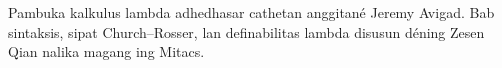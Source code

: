 \documentclass[../../include/open-logic-part]{subfiles}
\begin{document}

\begin{editorial}
Pambuka kalkulus lambda adhedhasar cathetan anggitané Jeremy Avigad. Bab sintaksis, sipat Church--Rosser, lan definabilitas lambda disusun déning Zesen Qian nalika magang ing Mitacs.
\end{editorial}





\OLEndPartHook
\end{document}
